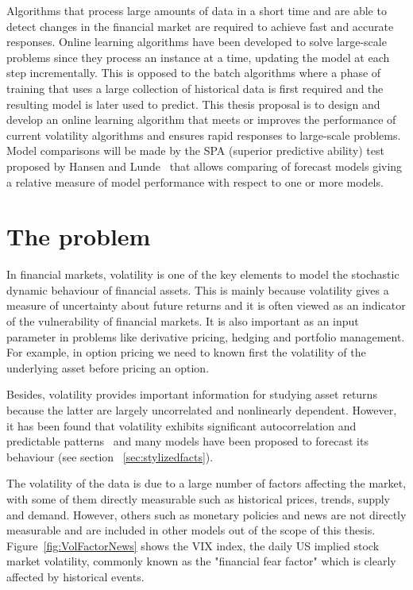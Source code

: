 Algorithms that process large amounts of data in a short time and are able to detect changes in the financial market are required to achieve fast and accurate responses. Online learning algorithms have been developed to solve large-scale problems since they process an instance at a time, updating the model at each step incrementally. This is opposed to the batch algorithms where a phase of training that uses a large collection of historical data is first required and the resulting model is later used to predict. 
This thesis proposal is to design and develop an online learning algorithm that meets or improves the performance of current volatility algorithms and ensures rapid responses to large-scale problems. Model comparisons will be made by the SPA (superior predictive ability) test proposed by Hansen and
Lunde~\cite{hansen+lunde2006}  that allows comparing of forecast models giving a relative measure of model performance with respect to one or more models.



\section{The problem}

In financial markets, volatility is one of the key elements to model the stochastic dynamic behaviour of financial assets. This is mainly because volatility gives a measure of uncertainty about future returns and it is often viewed as an indicator of the vulnerability of financial markets. It is also important as an input parameter in problems like derivative pricing, hedging and portfolio management. For example, in option pricing we need to known first the volatility of the underlying asset before pricing an option. 

Besides, volatility provides important information for studying asset returns because the latter are largely uncorrelated and nonlinearly dependent. However, it has been found that volatility exhibits significant autocorrelation and predictable patterns~\cite{poon+granger2003} and  many models have been proposed to forecast its behaviour (see section ~\ref{sec:stylizedfacts}).

The volatility of the data is due to a large number of factors affecting the market, with some of them directly measurable such as historical prices, trends, supply and demand. However, others such as monetary policies and news are not directly measurable and are included in other models out of the scope of this thesis. Figure~\ref{fig:VolFactorNews} shows the VIX index, the daily US implied stock market volatility, commonly known as the "financial fear factor" which is clearly affected by historical events.


